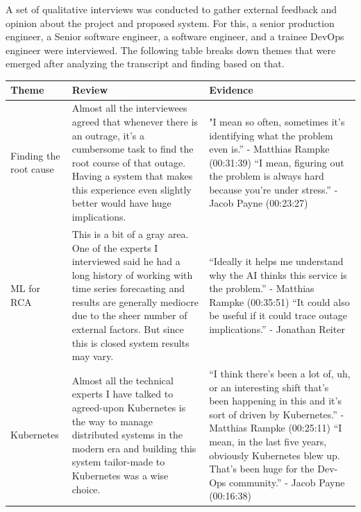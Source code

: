 A set of qualitative interviews was conducted to gather external feedback and opinion about the project and proposed system. For this, a senior production engineer, a Senior software engineer, a software engineer, and a trainee DevOps engineer were interviewed. The following table breaks down themes that were emerged after analyzing the transcript and finding based on that.
\newpage
\begin{longtable}{|p{30mm}|p{61mm}|p{60mm}|}
    \hline
    \textbf{Theme} &
    \textbf{Review} &
    \textbf{Evidence} \\ \hline
    
    Finding the root cause &
    Almost all the interviewees agreed that whenever there is an outrage, it’s a cumbersome task to find the root course of that outage. Having a system that makes this experience even slightly better would have huge implications. &
    "I mean so often, sometimes it's identifying what the problem even is.” - Matthias Rampke (00:31:39)
    \newline
    \newline
    “I mean, figuring out the problem is always hard because you're under stress.” - Jacob Payne (00:23:27)
    \\ \hline

    
    
    ML for RCA &
    This is a bit of a gray area. One of the experts I interviewed said he had a long history of working with time series forecasting and results are generally mediocre due to the sheer number of external factors. But since this is closed system results may vary. &
    “Ideally it helps me understand why the AI thinks this service is the problem.” \newline- Matthias Rampke (00:35:51)
    \newline
    \newline
    “It could also be useful if it could trace outage implications.” \newline- Jonathan Reiter \\ \hline
    
    
    Kubernetes &
    Almost all the technical experts I have talked to agreed-upon Kubernetes is the way to manage distributed systems in the modern era and building this system tailor-made to Kubernetes was a wise choice. &
    “I think there's been a lot of, uh, or an interesting shift that's been happening in this and it's sort of driven by Kubernetes.” \newline- Matthias Rampke (00:25:11)
    \newline
    “I mean, in the last five years, obviously Kubernetes blew up. That's been huge for the Dev-Ops community.” \newline- Jacob Payne (00:16:38) \\ \hline
        

\end{longtable}
